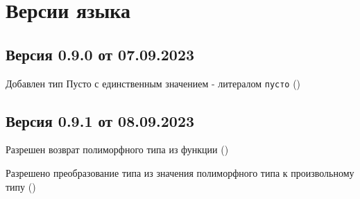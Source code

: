 \hypertarget{versions}{%
\section{Версии языка}\label{versions:chapter}}

\hypertarget{v090}{%
\subsection{Версия 0.9.0 от 07.09.2023}\label{versions:v090}}

\begin{d_itemize}
\item Добавлен тип Пусто с единственным значением - литералом \verb+пусто+  ()
\end{d_itemize}

\hypertarget{v091}{%
\subsection{Версия 0.9.1 от 08.09.2023}\label{versions:v091}}

\begin{d_itemize}
\item Разрешен возврат полиморфного типа из функции  ()
\item Разрешено преобразование типа из значения полиморфного типа к произвольному типу  ()
\end{d_itemize}